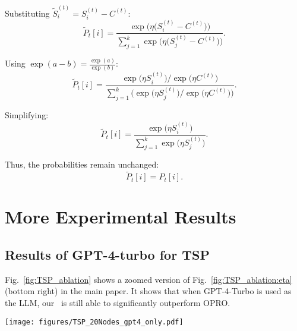 Substituting \( \tilde{S}_i^{(t)} = S_i^{(t)} - C^{(t)} \):
\begin{equation}
\tilde{P}_t[i] = \frac{\exp\big(\eta \big(S_i^{(t)} - C^{(t)}\big)\big)}{\sum_{j=1}^k \exp\big(\eta \big(S_j^{(t)} - C^{(t)}\big)\big)}.
\end{equation}

Using \( \exp(a - b) = \frac{\exp(a)}{\exp(b)} \):
\begin{equation}
\tilde{P}_t[i] = \frac{\exp\big(\eta S_i^{(t)}\big) / \exp\big(\eta C^{(t)}\big)}{
\sum_{j=1}^k \big(\exp\big(\eta S_j^{(t)}\big) / \exp\big(\eta C^{(t)}\big)\big)}.
\end{equation}

Simplifying:
\begin{equation}
\tilde{P}_t[i] = \frac{\exp\big(\eta S_i^{(t)}\big)}{\sum_{j=1}^k \exp\big(\eta S_j^{(t)}\big)}.
\end{equation}

Thus, the probabilities remain unchanged:
\begin{equation}
\tilde{P}_t[i] = P_t[i].
\end{equation}







\section{More Experimental Results}

\subsection{Results of GPT-4-turbo for TSP}
\label{app:ablation:subsec:gpt4-turbo}
Fig.~\ref{fig:TSP_ablation} shows a zoomed version of Fig.~\ref{fig:TSP_ablation:eta} (bottom right) in the main paper. It shows that when GPT-4-Turbo is used as the LLM, our \alg~is still able to significantly outperform OPRO.
\begin{figure*}[h]
    \centering
    \texttt{[image: figures/TSP\_20Nodes\_gpt4\_only.pdf]}    
    \caption{Ablation study results using GPT-4-turbo in the TSP task with 20 nodes.}
    \label{fig:TSP_ablation}
\end{figure*}


